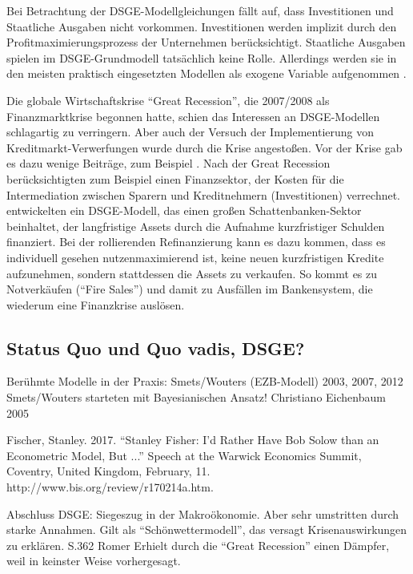 Bei Betrachtung der DSGE-Modellgleichungen fällt auf, dass Investitionen und Staatliche Ausgaben nicht vorkommen. Investitionen werden implizit durch den Profitmaximierungsprozess der Unternehmen berücksichtigt. Staatliche Ausgaben spielen im DSGE-Grundmodell tatsächlich keine Rolle. Allerdings werden sie in den meisten praktisch eingesetzten Modellen als exogene Variable aufgenommen \parencite[S. 361]{Romer2015}.

Die globale Wirtschaftskrise "`Great Recession"', die 2007/2008 als Finanzmarktkrise begonnen hatte, schien das Interessen an DSGE-Modellen schlagartig zu verringern. Aber auch der Versuch der Implementierung von Kreditmarkt-Verwerfungen wurde durch die Krise angestoßen. Vor der Krise gab es dazu wenige Beiträge, zum Beispiel \textcite{Gertler2015}. Nach der Great Recession berücksichtigten zum Beispiel \textcite{Curdia2016} einen Finanzsektor, der Kosten für die Intermediation zwischen Sparern und Kreditnehmern (Investitionen) verrechnet. \textcite{Gertler2015} entwickelten ein DSGE-Modell, das einen großen Schattenbanken-Sektor beinhaltet, der langfristige Assets durch die Aufnahme kurzfristiger Schulden finanziert. Bei der rollierenden Refinanzierung kann es dazu kommen, dass es individuell gesehen nutzenmaximierend ist, keine neuen kurzfristigen Kredite aufzunehmen, sondern stattdessen die Assets zu verkaufen. So kommt es zu Notverkäufen ("`Fire Sales"') und damit zu Ausfällen im Bankensystem, die wiederum eine Finanzkrise auslösen.




\subsection{Status Quo und Quo vadis, DSGE?}

Berühmte Modelle in der Praxis: 
Smets/Wouters (EZB-Modell) 2003, 2007, 2012
Smets/Wouters starteten mit Bayesianischen Ansatz!
Christiano Eichenbaum 2005



Fischer, Stanley. 2017. “Stanley Fisher: I’d
Rather Have Bob Solow than an Econometric
Model, But ...” Speech at the Warwick Economics
Summit, Coventry, United Kingdom, February, 11.
http://www.bis.org/review/r170214a.htm.


Abschluss DSGE: Siegeszug in der Makroökonomie. Aber sehr umstritten durch starke Annahmen. Gilt als "`Schönwettermodell"', das versagt Krisenauswirkungen zu erklären. S.362 Romer
Erhielt durch die "`Great Recession"' einen Dämpfer, weil in keinster Weise vorhergesagt.

